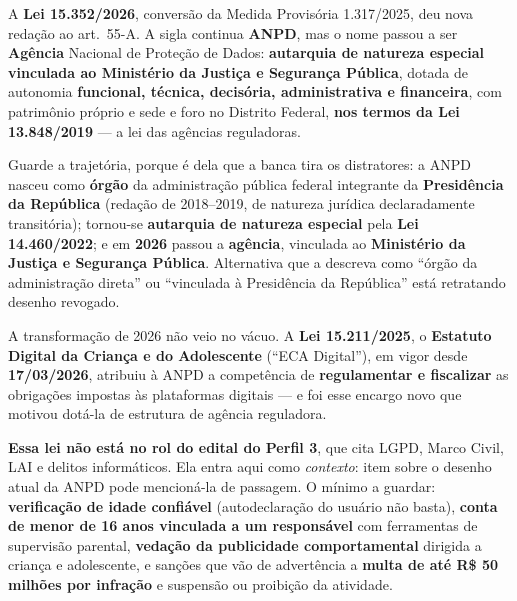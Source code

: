 \begin{conceito}
A \textbf{Lei 15.352/2026}, conversão da Medida Provisória 1.317/2025, deu
nova redação ao art.\ 55-A. A sigla continua \textbf{ANPD}, mas o nome passou
a ser \textbf{Agência} Nacional de Proteção de Dados: \textbf{autarquia de
natureza especial vinculada ao Ministério da Justiça e Segurança Pública},
dotada de autonomia \textbf{funcional, técnica, decisória, administrativa e
financeira}, com patrimônio próprio e sede e foro no Distrito Federal,
\textbf{nos termos da Lei 13.848/2019} --- a lei das agências reguladoras.

Guarde a trajetória, porque é dela que a banca tira os distratores: a ANPD
nasceu como \textbf{órgão} da administração pública federal integrante da
\textbf{Presidência da República} (redação de 2018--2019, de natureza jurídica
declaradamente transitória); tornou-se \textbf{autarquia de natureza especial}
pela \textbf{Lei 14.460/2022}; e em \textbf{2026} passou a \textbf{agência},
vinculada ao \textbf{Ministério da Justiça e Segurança Pública}. Alternativa
que a descreva como ``órgão da administração direta'' ou ``vinculada à
Presidência da República'' está retratando desenho revogado.
\end{conceito}

\begin{conceito}
A transformação de 2026 não veio no vácuo. A \textbf{Lei 15.211/2025}, o
\textbf{Estatuto Digital da Criança e do Adolescente} (``ECA Digital''), em
vigor desde \textbf{17/03/2026}, atribuiu à ANPD a competência de
\textbf{regulamentar e fiscalizar} as obrigações impostas às plataformas
digitais --- e foi esse encargo novo que motivou dotá-la de estrutura de
agência reguladora.

\textbf{Essa lei não está no rol do edital do Perfil 3}, que cita LGPD, Marco
Civil, LAI e delitos informáticos. Ela entra aqui como \emph{contexto}: item
sobre o desenho atual da ANPD pode mencioná-la de passagem. O mínimo a
guardar: \textbf{verificação de idade confiável} (autodeclaração do usuário
não basta), \textbf{conta de menor de 16 anos vinculada a um responsável} com
ferramentas de supervisão parental, \textbf{vedação da publicidade
comportamental} dirigida a criança e adolescente, e sanções que vão de
advertência a \textbf{multa de até R\$ 50 milhões por infração} e suspensão ou
proibição da atividade.
\end{conceito}

